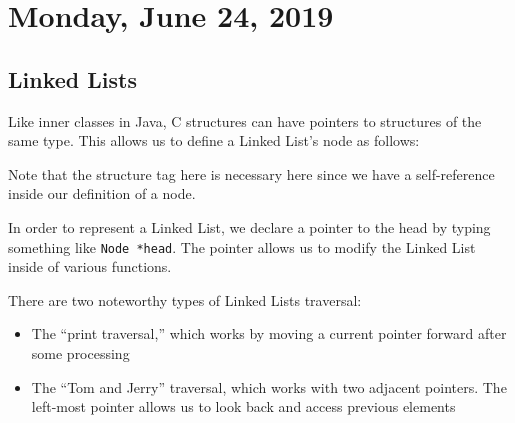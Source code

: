 \section{Monday, June 24, 2019}

\subsection{Linked Lists}
Like inner classes in Java, C structures can have pointers to structures of the same type. This allows us to define a Linked List's node as follows:


\lstset{
caption=Linked List Node}
\begin{center}
\label{Command Line Parameters}
\end{center}


Note that the structure tag here is necessary here since we have a self-reference inside our definition of a node.

In order to represent a Linked List, we declare a pointer to the head by typing something like \verb!Node *head!. The pointer allows us to modify the Linked List inside of various functions.

There are two noteworthy types of Linked Lists traversal: \begin{itemize}
    \item The ``print traversal,'' which works by moving a current pointer forward after some processing 
    
    \lstset{
    caption=Print Traversal}
    \begin{center}
    \label{Print Traversal}
    \end{center}
    
    \item The ``Tom and Jerry'' traversal, which works with two adjacent pointers. The left-most pointer allows us to look back and access previous elements 
    
    \lstset{
    caption=Tom and Jerry Traversal}
    \begin{center}
    \label{Tom and Jerry}
    \end{center}

\end{itemize}

